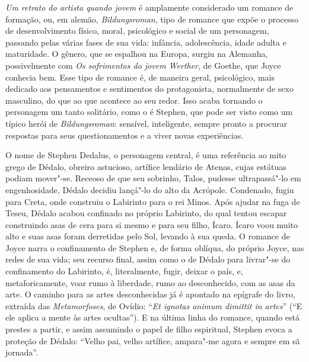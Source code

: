 \textit{Um retrato do artista quando jovem} é amplamente considerado um romance
de formação, ou, em alemão, \textit{Bildungsroman}, tipo de romance que expõe o
processo de desenvolvimento físico, moral, psicológico e social de um
personagem, passando pelas várias fases de sua vida: infância, adolescência,
idade adulta e maturidade. O gênero, que se espalhou na Europa, surgiu na
Alemanha, possivelmente com \textit{Os sofrimentos do jovem Werther}, de
Goethe, que Joyce conhecia bem. Esse tipo de romance é, de maneira geral,
psicológico, mais dedicado aos pensamentos e sentimentos do protagonista,
normalmente de sexo masculino, do que ao que acontece ao seu redor. Isso acaba
tornando o personagem um tanto solitário, como o é Stephen, que pode ser visto
como um típico herói de \textit{Bildungsroman}: sensível, inteligente, sempre
pronto a procurar respostas para seus questionamentos e a viver novas
experiências.  

O nome de Stephen Dedalus, o personagem central, é uma referência ao
mito grego de Dédalo, obreiro astucioso, artífice lendário de Atenas,
cujas estátuas podiam mover"-se. Receoso de que seu sobrinho, Talos,
pudesse ultrapassá"-lo em engenhosidade, Dédalo decidiu lançá"-lo do alto
da Acrópole. Condenado, fugiu para Creta, onde construiu o Labirinto
para o rei Minos. Após ajudar na fuga de Teseu, Dédalo acabou confinado
no próprio Labirinto, do qual tentou escapar construindo asas de cera
para si mesmo e para seu filho, Ícaro. Ícaro voou muito alto e suas
asas foram derretidas pelo Sol, levando à sua queda. O romance de Joyce
narra o confinamento de Stephen e, de forma oblíqua, do próprio Joyce,
nas redes de sua vida; seu recurso final, assim como o de Dédalo para
livrar"-se do confinamento do Labirinto, é, literalmente, fugir, deixar
o país, e, metaforicamente, voar rumo à liberdade, rumo ao
desconhecido, com as asas da arte. O caminho para as artes
desconhecidas já é apontado na epígrafe do livro, extraída das
\textit{Metamorfoses}, de Ovídio: “\textit{Et ignotas animum dimittit
in artes}” (“E ele aplica a mente às artes ocultas”). E na última linha
do romance, quando está prestes a partir, e assim assumindo o papel de
filho espiritual, Stephen evoca a proteção de Dédalo: “Velho pai, velho
artífice, ampara"-me agora e sempre em sã jornada”. 

